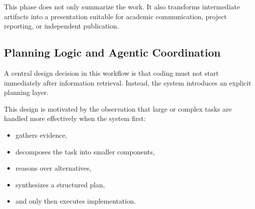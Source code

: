 \documentclass[11pt,a4paper]{article}
\begin{document}
This phase does not only summarize the work. It also transforms intermediate artifacts into a presentation suitable for academic communication, project reporting, or independent publication.

\subsection{Planning Logic and Agentic Coordination}

A central design decision in this workflow is that coding must not start immediately after information retrieval. Instead, the system introduces an explicit planning layer.

This design is motivated by the observation that large or complex tasks are handled more effectively when the system first:
\begin{itemize}
    \item gathers evidence,
    \item decomposes the task into smaller components,
    \item reasons over alternatives,
    \item synthesizes a structured plan,
    \item and only then executes implementation.
\end{itemize}
\end{document}
